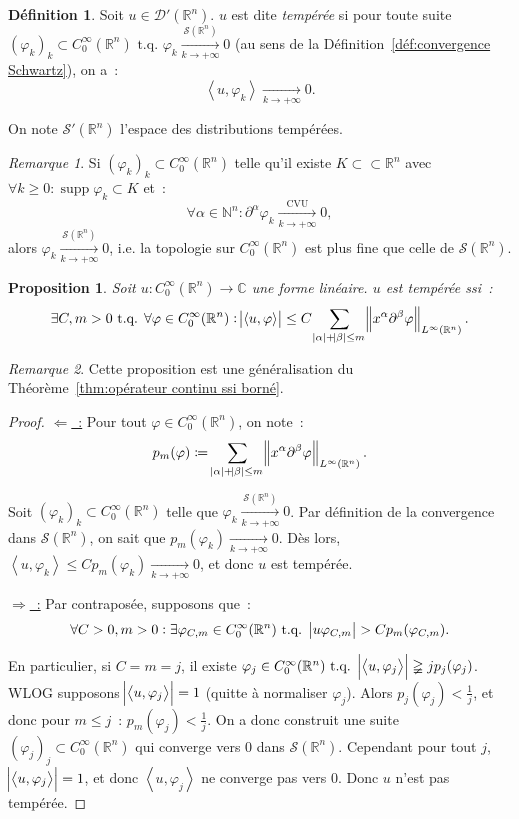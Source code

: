 \documentclass{report}
\DeclareMathOperator{\supp}{supp}
\newcommand{\C}{{\mathbb C}}
\newcommand{\R}{{\mathbb R}}
\newcommand{\N}{{\mathbb N}}
\newcommand{\scpr}[2]{\left\langle#1, #2\right\rangle}
\newcommand{\tq}{\text{ t.q. }}
\newcommand{\st}{\tq}
\newcommand{\pinfty}{{+\infty}}
\newtheorem{prp}[thm]{Proposition}
\theoremstyle{definition}
\newtheorem{déf}[thm]{Définition}
\theoremstyle{remark}
\newtheorem*{rmq}{Remarque}
\begin{document}
\begin{déf} Soit $u \in \mathcal D'(\R^n)$. $u$ est dite \textit{tempérée} si pour toute suite
$(\varphi_k)_k \subset C^\infty_0(\R^n) \st \varphi_k \xrightarrow[k \to \pinfty]{\mathcal S(\R^n)} 0$ (au sens de la Définition~\ref{déf:convergence Schwartz}), on a~:
\[\scpr u{\varphi_k} \xrightarrow[k \to \pinfty]{} 0.\]

On note $\mathcal S'(\R^n)$ l'espace des distributions tempérées.
\end{déf}

\begin{rmq} Si $(\varphi_k)_k \subset C^\infty_0(\R^n)$ telle qu'il existe $K \subset\subset \R^n$ avec $\forall k \geq 0 : \supp \varphi_k \subset K$ et~:
\[\forall \alpha \in \N^n : \partial^\alpha \varphi_k \xrightarrow[k \to \pinfty]{\text{CVU}} 0,\]
alors $\varphi_k \xrightarrow[k \to \pinfty]{\mathcal S(\R^n)} 0$, i.e. la topologie sur $C^\infty_0(\R^n)$ est plus fine que celle de $\mathcal S(\R^n)$.
\end{rmq}

\begin{prp}\label{prp:borné ssi continu distributions tempérées} Soit $u : C^\infty_0(\R^n) \to \C$ une forme linéaire. $u$ est tempérée ssi~:
\[\exists C, m > 0 \st \forall \varphi \in C^\infty_0(\R^n) : \abs {\scpr u\varphi} \leq C\sum_{\abs \alpha + \abs \beta \leq m}\norm {x^\alpha\partial^\beta\varphi}_{L^\infty(\R^n)}.\]
\end{prp}

\begin{rmq}Cette proposition est une généralisation du Théorème~\ref{thm:opérateur continu ssi borné}.
\end{rmq}

\begin{proof} \underline {$\Leftarrow$~:} Pour tout $\varphi \in C^\infty_0(\R^n)$, on note~:
\[p_m(\varphi) \coloneqq \sum_{\abs \alpha + \abs\beta \leq m}\norm {x^\alpha\partial^\beta\varphi}_{L^\infty(\R^n)}.\]

Soit $(\varphi_k)_k \subset C^\infty_0(\R^n)$ telle que $\varphi_k \xrightarrow[k \to \pinfty]{\mathcal S(\R^n)} 0$. Par définition de la convergence dans $\mathcal S(\R^n)$, on sait
que $p_m(\varphi_k) \xrightarrow[k \to \pinfty]{} 0$. Dès lors, $\scpr u{\varphi_k} \leq Cp_m(\varphi_k) \xrightarrow[k \to \pinfty]{} 0$, et donc $u$ est tempérée.

\underline {$\Rightarrow$~:} Par contraposée, supposons que~:
\[\forall C > 0, m > 0 : \exists \varphi_{C,m} \in C^\infty_0(\R^n) \st \abs {u{\varphi_{C,m}}} > Cp_m(\varphi_{C,m}).\]

En particulier, si $C=m=j$, il existe $\varphi_j \in C^\infty_0(\R^n) \st \abs {\scpr u{\varphi_j}} \gneqq jp_j(\varphi_j)$. WLOG supposons $\abs {\scpr u{\varphi_j}}=1$
(quitte à normaliser $\varphi_j$). Alors $p_j(\varphi_j) < \frac 1j$, et donc pour $m \leq j$~: $p_m(\varphi_j) < \frac 1j$. On a donc construit une suite
$(\varphi_j)_j \subset C^\infty_0(\R^n)$ qui converge vers 0 dans $\mathcal S(\R^n)$. Cependant pour tout $j$, $\abs {\scpr u{\varphi_j}} = 1$, et donc $\scpr u{\varphi_j}$
ne converge pas vers 0. Donc $u$ n'est pas tempérée.
\end{proof}
\end{document}
